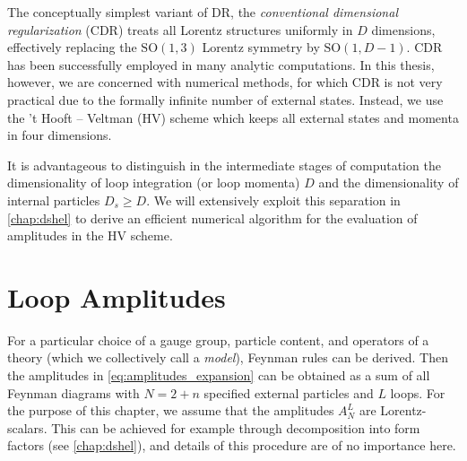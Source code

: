 The conceptually simplest variant of DR, the \emph{conventional dimensional regularization} (CDR)
treats all Lorentz structures uniformly in $D$ dimensions, effectively replacing the $\mathrm{SO}(1,3)$ Lorentz symmetry by $\mathrm{SO}(1,D-1)$.
CDR has been successfully employed in many analytic computations.
In this thesis, however, we are concerned with numerical methods, for which CDR is not very practical due to the
formally infinite number of external states.
Instead, we use the 't Hooft -- Veltman (HV) scheme which keeps all external states and momenta in four dimensions.

It is advantageous to distinguish in the intermediate stages of computation the dimensionality of loop integration (or loop momenta) $D$ and
the dimensionality of internal particles $D_s \geq  D$.
We will extensively exploit this separation in \cref{chap:dshel} to derive an efficient numerical algorithm
for the evaluation of amplitudes in the HV scheme.


\section{Loop Amplitudes}

For a particular choice of a gauge group, particle content, and operators of
a theory (which we collectively call a \emph{model}), Feynman rules can be derived.
Then the amplitudes in \cref{eq:amplitudes_expansion} can be obtained as a sum of all Feynman diagrams
with $N = 2+n$ specified external particles and $L$ loops.
For the purpose of this chapter, we assume that the amplitudes $A^{L}_N$ are Lorentz-scalars.
This can be achieved for example through decomposition into form factors (see \cref{chap:dshel}),
and details of this procedure are of no importance here.

